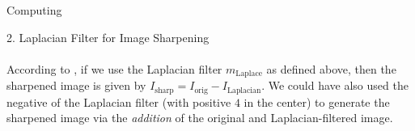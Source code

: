 \begin{section}{Computing}
\begin{homeworkSection}{2. Laplacian Filter for Image Sharpening}
{	\\
	\\
	According to \cite{chang}, if we use the Laplacian filter $m_{\text{Laplace}}$ as defined above, then the sharpened image is given by $I_{\text{sharp}} = I_{\text{orig}} - I_{\text{Laplacian}}$. We could have also used the negative of the Laplacian filter (with positive $4$ in the center) to generate the sharpened image via the \textit{addition} of the original and Laplacian-filtered image. 
}
\\
\end{homeworkSection}
\end{section}
